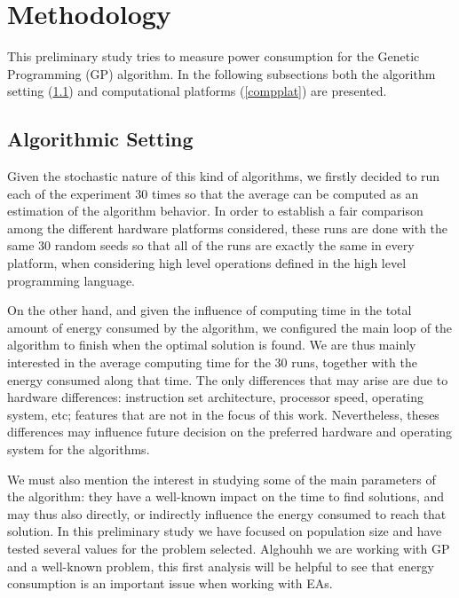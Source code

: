 \section{Methodology}
\label{methodology}

This preliminary study tries to measure power consumption for 
the Genetic Programming (GP) algorithm. In the following subsections both the algorithm setting (\ref{algsetting}) and computational platforms (\ref{compplat}) are presented.

\subsection{Algorithmic Setting}
\label{algsetting}

Given the stochastic nature of this kind of algorithms, we firstly decided to run each of the experiment 30 times so that the average can be computed as an estimation of the algorithm behavior. In order to establish a fair comparison among the different hardware platforms considered, these runs are done with the same 30 random seeds so that all of the runs are exactly the same in every platform, when considering high level operations defined in the high level programming language.

On the other hand, and given the influence of computing time in the total amount of energy consumed by the algorithm, we configured the main loop of the algorithm to finish when 
the optimal solution is found.  We are thus mainly interested in the average computing time for the 30 runs, together with the energy consumed along that time.  The only differences that may arise are due to hardware differences:  instruction set architecture, processor speed, operating system, etc;  %
features that are not in the focus of this work.  Nevertheless, theses differences may influence future decision on the preferred hardware and operating system for the algorithms.  

We must also mention the interest in studying some of the main parameters of the algorithm:  they have a well-known impact on the time to find solutions, and may thus also directly, or indirectly influence the energy consumed to reach that solution.  In this preliminary study we have focused on population size and have tested several values for the problem selected.  Alghouhh we are working with GP and a well-known problem, this first analysis will be helpful to see that energy consumption is an important issue when working with EAs.

